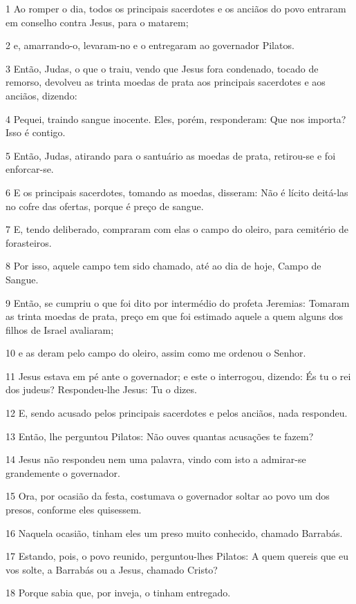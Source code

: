 \par 1 Ao romper o dia, todos os principais sacerdotes e os anciãos do povo entraram em conselho contra Jesus, para o matarem;
\par 2 e, amarrando-o, levaram-no e o entregaram ao governador Pilatos.
\par 3 Então, Judas, o que o traiu, vendo que Jesus fora condenado, tocado de remorso, devolveu as trinta moedas de prata aos principais sacerdotes e aos anciãos, dizendo:
\par 4 Pequei, traindo sangue inocente. Eles, porém, responderam: Que nos importa? Isso é contigo.
\par 5 Então, Judas, atirando para o santuário as moedas de prata, retirou-se e foi enforcar-se.
\par 6 E os principais sacerdotes, tomando as moedas, disseram: Não é lícito deitá-las no cofre das ofertas, porque é preço de sangue.
\par 7 E, tendo deliberado, compraram com elas o campo do oleiro, para cemitério de forasteiros.
\par 8 Por isso, aquele campo tem sido chamado, até ao dia de hoje, Campo de Sangue.
\par 9 Então, se cumpriu o que foi dito por intermédio do profeta Jeremias: Tomaram as trinta moedas de prata, preço em que foi estimado aquele a quem alguns dos filhos de Israel avaliaram;
\par 10 e as deram pelo campo do oleiro, assim como me ordenou o Senhor.
\par 11 Jesus estava em pé ante o governador; e este o interrogou, dizendo: És tu o rei dos judeus? Respondeu-lhe Jesus: Tu o dizes.
\par 12 E, sendo acusado pelos principais sacerdotes e pelos anciãos, nada respondeu.
\par 13 Então, lhe perguntou Pilatos: Não ouves quantas acusações te fazem?
\par 14 Jesus não respondeu nem uma palavra, vindo com isto a admirar-se grandemente o governador.
\par 15 Ora, por ocasião da festa, costumava o governador soltar ao povo um dos presos, conforme eles quisessem.
\par 16 Naquela ocasião, tinham eles um preso muito conhecido, chamado Barrabás.
\par 17 Estando, pois, o povo reunido, perguntou-lhes Pilatos: A quem quereis que eu vos solte, a Barrabás ou a Jesus, chamado Cristo?
\par 18 Porque sabia que, por inveja, o tinham entregado.
